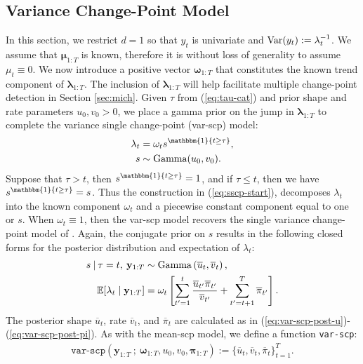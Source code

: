 \subsection{Variance Change-Point Model}
\label{sec:sscp}

In this section, we restrict $d = 1$ so that $y_t$ is univariate and $\text{\normalfont Var}(y_t) := \lambda_t^{-1}$. We assume that $\boldsymbol{\mu}_{1:T}$ is known, therefore it is without loss of generality to assume $\mu_{t} \equiv 0$. We now introduce a positive vector $\boldsymbol{\omega}_{1:T}$ that constitutes the known trend component of $\boldsymbol{\lambda}_{1:T}$. The inclusion of $\boldsymbol{\lambda}_{1:T}$ will help facilitate multiple change-point detection in Section \ref{sec:mich}. Given $\tau$ from (\ref{eq:tau-cat}) and prior shape and rate parameters $u_0, v_0 > 0$, we place a gamma prior on the jump in $\boldsymbol{\lambda}_{1:T}$ to complete the variance single change-point (var-scp) model:
\begin{align}\label{eq:sscp-start}
    \lambda_t &= \omega_t s^{\mathbbm{1}\{t \geq \tau\}}, \\
    s &\sim \text{Gamma}(u_0,v_0).
    \label{eq:sscp-end}
\end{align}
Suppose that $\tau > t$, then $s^{\mathbbm{1}\{t \geq \tau\}} = 1$, and if $\tau \leq t$, then we have $s^{\mathbbm{1}\{t \geq \tau\}} = s$. Thus the construction in (\ref{eq:sscp-start}), decomposes $\lambda_t$ into the known component $\omega_{t}$ and a piecewise constant component equal to one or $s$. When $\omega_t \equiv 1$, then the var-scp model recovers the single variance change-point model of \cite{Cappello22}. Again, the conjugate prior on $s$ results in the following closed forms for the posterior distribution and expectation of $\lambda_t$:
\begin{align}
    s \:|\: \tau = t, \: \mathbf{y}_{1:T} &\sim \text{Gamma}\left(\overline{u}_{t}, \overline{v}_{t}\right), \label{eq:s-sscp} \\
    \mathbb{E}[ \lambda_{t}\;|\;\mathbf{y}_{1:T}] &= \omega_t\left[\sum_{t'=1}^{t} \frac{\overline{u}_{t'}\overline{\pi}_{t'}}{\overline{v}_{t'}}  + \sum_{t'=t+1}^T \overline{\pi}_{t'}\right]. \label{eq:lambda-post-mean}
\end{align}
The posterior shape $\overline{u}_{t}$, rate $\overline{v}_{t}$, and $\overline{\pi}_t$ are calculated as in (\ref{eq:var-scp-post-u})-(\ref{eq:var-scp-post-pi}). As with the mean-scp model, we define a function \texttt{var-scp}: 
\begin{align}\label{eq:var-scp-fn}
    \texttt{var-scp}\left(\mathbf{y}_{1:T} \:;\: \boldsymbol{\omega}_{1:T}, u_0, v_0, \boldsymbol{\pi}_{1:T}\right) := \{\overline{u}_t, \overline{v}_t, \overline{\pi}_t\}_{t=1}^T.
\end{align}

